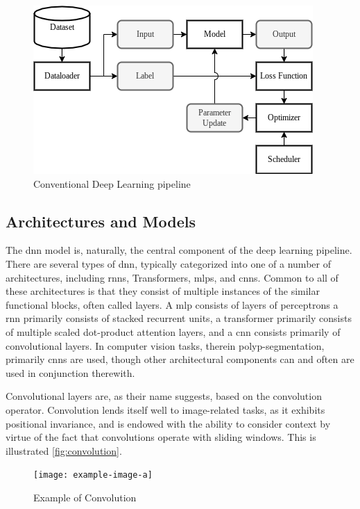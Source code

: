     \begin{figure}[h]
        \centering
        \includegraphics[width=0.75\linewidth]{illustrations/pipeline.png}
        \caption{Conventional Deep Learning pipeline}
        \label{fig:pipeline}
    \end{figure}
    
    \subsection{Architectures and Models}
        The \gls{dnn} model is, naturally, the central component of the deep learning pipeline. There are several types of \gls{dnn}, typically categorized into one of a number of architectures, including \glspl{rnn}, Transformers, \glspl{mlp}, and \glspl{cnn}. Common to all of these architectures is that they consist of multiple instances of the similar functional blocks, often called layers. A \gls{mlp} consists of layers of perceptrons a \gls{rnn} primarily consists of stacked recurrent units, a transformer primarily consists of multiple scaled dot-product attention layers, and a \gls{cnn} consists primarily of convolutional layers. In computer vision tasks, therein polyp-segmentation, primarily  \glspl{cnn} are used, though other architectural components can and often are used in conjunction therewith.
        
        Convolutional layers are, as their name suggests, based on the convolution operator. Convolution lends itself well to image-related tasks, as it exhibits positional invariance, and is endowed with the ability to consider context by virtue of the fact that convolutions operate with sliding windows. This is illustrated \autoref{fig:convolution}.
        \begin{figure}
            \centering
            \texttt{[image: example-image-a]}
            \caption{Example of Convolution}
            \label{fig:convolution}
        \end{figure}
        
